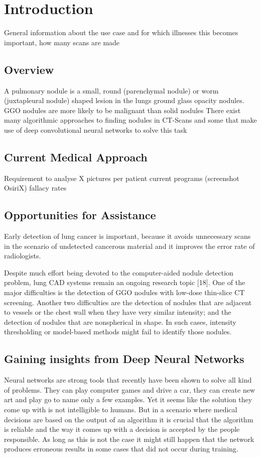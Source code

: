 \documentclass[main.tex]{subfiles}
\begin{document}
\chapter{Introduction}
General information about the use case and for which illnesses this becomes important, how many scans are made
\section{Overview}
 A pulmonary nodule is a small, round (parenchymal nodule) or worm (juxtapleural nodule) shaped lesion in the lungs
 ground glass opacity nodules.
 GGO nodules are more likely to be malignant than solid nodules
There exist many algorithmic approaches to finding nodules in CT-Scans \cite{papers_classical} and some that
make use of deep convolutional neural networks to solve this task \cite{papers_dnn}

\section{Current Medical Approach}
Requirement to analyse X pictures per patient
current programs (screenshot OsiriX)
fallacy rates

\section{Opportunities for Assistance}

Early detection of lung cancer is important, because it avoids unnecessary scans in the scenario
of undetected cancerous material and it improves the error rate of radiologists.

Despite much effort being devoted to the computer-aided nodule detection problem, lung CAD systems remain an ongoing
research topic [18]. One of the major difficulties is the detection of GGO nodules with low-dose thin-slice CT screening. Another two difficulties are the detection of nodules that are adjacent to vessels or the chest wall when they have very similar intensity; and the detection of nodules that are nonspherical in shape. In such cases, intensity thresholding or model-based methods might fail to identify those nodules.

\section{Gaining insights from Deep Neural Networks}
Neural networks are strong tools that recently have been shown to solve all kind of problems. They can play
computer games and drive a car, they can create new art and play go to name only a few examples. Yet it seems like the solution they come up with is not intelligible to humans. But in a scenario where medical decisions are based on the output of an algorithm it is crucial that the algorithm is reliable and the way it comes up with a decision is accepted by the people responsible. As long as this is not the case it might still happen that the network produces erroneous results in some cases that did not occur during training.
\end{document}
